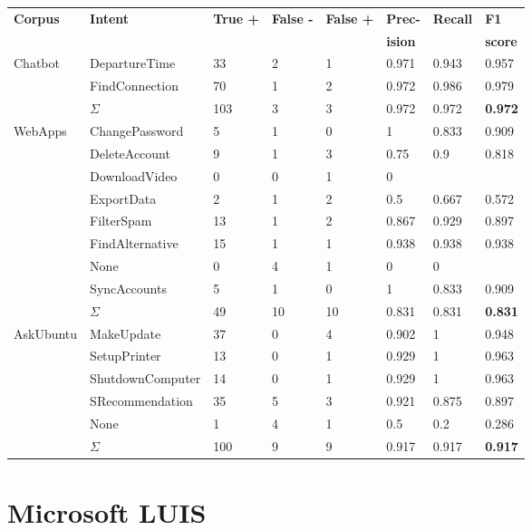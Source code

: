 \begin{center}
    \begin{tabular}{l l l l l l l l}
        \textbf{Corpus} & \textbf{Intent} & \textbf{True +} & \textbf{False -} & \textbf{False +} & \textbf{Prec-} & \textbf{Recall} & \textbf{F1}\\
        & & & & & \textbf{ision} & & \textbf{score} \\
        \hline
        \multirow{3}{*}{Chatbot} & DepartureTime & 33 & 2 & 1 & 0.971 & 0.943 & 0.957 \\
        & FindConnection & 70 & 1 & 2 & 0.972 & 0.986 & 0.979 \\
        & $\Sigma$ & 103 & 3 & 3 & 0.972 & 0.972 & \textbf{0.972} \\
        \hline
        \multirow{9}{*}{WebApps} & ChangePassword & 5 & 1 & 0 & 1 & 0.833 & 0.909 \\
        & DeleteAccount & 9 & 1 & 3 & 0.75 & 0.9 & 0.818 \\
        & DownloadVideo & 0 & 0 & 1 & 0 & &  \\
        & ExportData & 2 & 1 & 2 & 0.5 & 0.667 & 0.572 \\
        & FilterSpam & 13 & 1 & 2 & 0.867 & 0.929 & 0.897 \\
        & FindAlternative & 15 & 1 & 1 & 0.938 & 0.938 & 0.938 \\
        & None & 0 & 4 & 1 & 0 & 0 &  \\
        & SyncAccounts & 5 & 1 & 0 & 1 & 0.833 & 0.909 \\
        & $\Sigma$ & 49 & 10 & 10 & 0.831 & 0.831 & \textbf{0.831} \\
        \hline
        \multirow{6}{*}{AskUbuntu} & MakeUpdate & 37 & 0 & 4 & 0.902 & 1 & 0.948 \\
        & SetupPrinter & 13 & 0 & 1 & 0.929 & 1 & 0.963 \\
        & ShutdownComputer & 14 & 0 & 1 & 0.929 & 1 & 0.963 \\
        & SRecommendation & 35 & 5 & 3 & 0.921 & 0.875 & 0.897\\
        & None & 1 & 4 & 1 & 0.5 & 0.2 & 0.286 \\
        & $\Sigma$ & 100 & 9 & 9 & 0.917 & 0.917 & \textbf{0.917}\\
        \hline
    \end{tabular}
\end{center}

\section{Microsoft LUIS}
\label{sec:recalculations_luis}
\vspace*{1cm}

